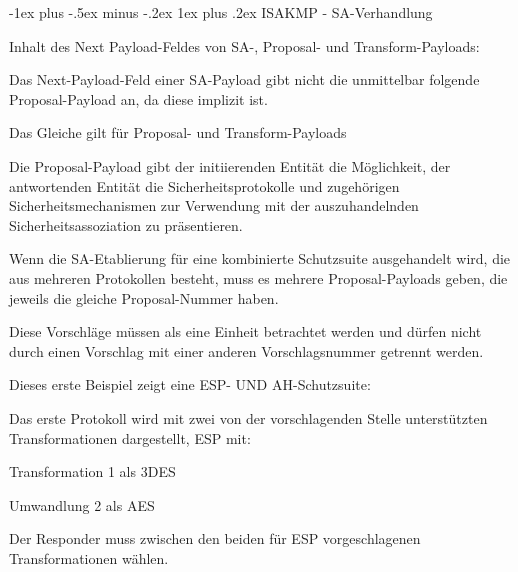 \documentclass[a4paper]{article}
\makeatletter
\renewcommand{\subsubsection}{\@startsection{subsubsection}{3}{0mm}%
 {-1ex plus -.5ex minus -.2ex}%
 {1ex plus .2ex}%
 {\normalfont\small\bfseries}}
\makeatother
\begin{document}
\begin{multicols}{3}
\begin{itemize*}
            \subsubsection{ISAKMP - SA-Verhandlung}
            \begin{itemize*}
                  \item       Inhalt des Next Payload-Feldes von SA-, Proposal- und
                  Transform-Payloads:
                  \begin{itemize*}
                        \item Das Next-Payload-Feld einer SA-Payload gibt nicht die unmittelbar folgende Proposal-Payload an, da diese implizit ist.
                        \item Das Gleiche gilt für Proposal- und Transform-Payloads
                  \end{itemize*}
                  \item       Die Proposal-Payload gibt der initiierenden Entität die Möglichkeit,
                  der antwortenden Entität die Sicherheitsprotokolle und zugehörigen
                  Sicherheitsmechanismen zur Verwendung mit der auszuhandelnden
                  Sicherheitsassoziation zu präsentieren.
                  \item       Wenn die SA-Etablierung für eine kombinierte Schutzsuite ausgehandelt
                  wird, die aus mehreren Protokollen besteht, muss es mehrere
                  Proposal-Payloads geben, die jeweils die gleiche Proposal-Nummer
                  haben.
                  \item       Diese Vorschläge müssen als eine Einheit betrachtet werden und dürfen
                  nicht durch einen Vorschlag mit einer anderen Vorschlagsnummer
                  getrennt werden.
                  \item       Dieses erste Beispiel zeigt eine ESP- UND AH-Schutzsuite:
                  \begin{itemize*}
                        \item Das erste Protokoll wird mit zwei von der vorschlagenden Stelle unterstützten Transformationen dargestellt, ESP mit:
                        \begin{itemize*} \item Transformation 1 als 3DES \item Umwandlung 2 als AES \item Der Responder muss zwischen den beiden für ESP vorgeschlagenen Transformationen wählen. \end{itemize*}

\end{itemize*}
\end{itemize*}
\end{itemize*}
\end{multicols}
\end{document}
